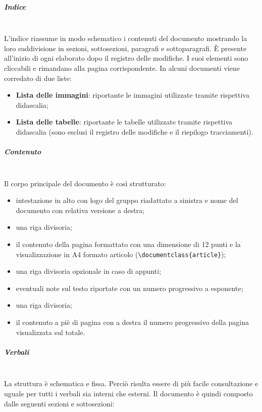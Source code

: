             \subparagraph{Indice}\mbox{}\\ [1mm]
                L'indice riassume in modo schematico i contenuti del documento mostrando la loro suddivisione in sezioni, sottosezioni, paragrafi e sottoparagrafi.
                È presente all'inizio di ogni elaborato dopo il registro delle modifiche. I suoi elementi sono cliccabili e rimandano alla pagina
                corrispondente. In alcuni documenti viene corredato di due liste:
                \begin{itemize}
                    \item \textbf{Lista delle immagini}: riportante le immagini utilizzate tramite rispettiva didascalia;
                    \item \textbf{Lista delle tabelle}: riportante le tabelle utilizzate tramite rispettiva didascalia (sono esclusi il registro delle modifiche
                                                        e il riepilogo tracciamenti).
                \end{itemize}
            \subparagraph{Contenuto}\mbox{}\\ [1mm]
                Il corpo principale del documento è così strutturato:
                \begin{itemize}
                    \item intestazione in alto con logo del gruppo riadattato a sinistra e nome del documento con relativa versione a destra;
                    \item una riga divisoria;
                    \item il contenuto della pagina formattato con una dimensione di 12 punti e la visualizzazione in A4 formato articolo
                          (\verb|\documentclass{article}|);
                    \item una riga divisoria opzionale in caso di appunti;
                    \item eventuali note sul testo riportate con un numero progressivo a esponente;
                    \item una riga divisoria;
                    \item il contenuto a piè di pagina con a destra il numero progressivo della pagina visualizzata sul totale.
                \end{itemize}
            \subparagraph{Verbali}\mbox{}\\ [1mm]
                La struttura è schematica e fissa. Perciò risulta essere di più facile consultazione e uguale per tutti i verbali sia interni che esterni. Il documento è quindi composto dalle seguenti sezioni e sottosezioni:
